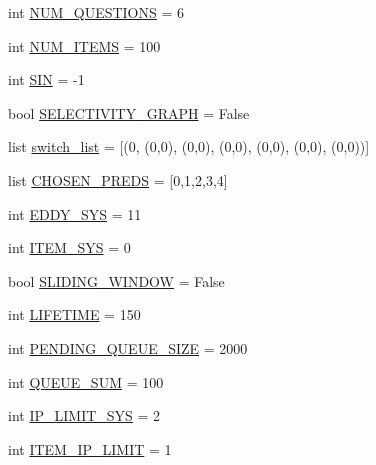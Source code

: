 \begin{DoxyCompactItemize}
\item 
int \mbox{\hyperlink{namespacedynamicfilterapp_1_1toggles_a6e9b8f89b507e81efe828c45c51e3906}{N\+U\+M\+\_\+\+Q\+U\+E\+S\+T\+I\+O\+NS}} = 6
\item 
int \mbox{\hyperlink{namespacedynamicfilterapp_1_1toggles_a0948720f253a5f2fc7689b2968c8b619}{N\+U\+M\+\_\+\+I\+T\+E\+MS}} = 100
\item 
int \mbox{\hyperlink{namespacedynamicfilterapp_1_1toggles_a46cfe1555e9636aa02be672a0dbfcee8}{S\+IN}} = -\/1
\item 
bool \mbox{\hyperlink{namespacedynamicfilterapp_1_1toggles_a7bfe56554845cde1c15e59ba47f471ed}{S\+E\+L\+E\+C\+T\+I\+V\+I\+T\+Y\+\_\+\+G\+R\+A\+PH}} = False
\item 
list \mbox{\hyperlink{namespacedynamicfilterapp_1_1toggles_abbafede9e00a5523a3cfea9fc4ff4764}{switch\+\_\+list}} = \mbox{[}(0, (0,0), (0,0), (0,0), (0,0), (0,0), (0,0))\mbox{]}
\item 
list \mbox{\hyperlink{namespacedynamicfilterapp_1_1toggles_a1e059d484294d0a2661de21590419600}{C\+H\+O\+S\+E\+N\+\_\+\+P\+R\+E\+DS}} = \mbox{[}0,1,2,3,4\mbox{]}
\item 
int \mbox{\hyperlink{namespacedynamicfilterapp_1_1toggles_a549d2c90f3f5922ad1442df2113fca1b}{E\+D\+D\+Y\+\_\+\+S\+YS}} = 11
\item 
int \mbox{\hyperlink{namespacedynamicfilterapp_1_1toggles_ae8b7db6fd373a0c3225ad361f894aee2}{I\+T\+E\+M\+\_\+\+S\+YS}} = 0
\item 
bool \mbox{\hyperlink{namespacedynamicfilterapp_1_1toggles_adf3c8ab64e62d33397a389d7ba49fe69}{S\+L\+I\+D\+I\+N\+G\+\_\+\+W\+I\+N\+D\+OW}} = False
\item 
int \mbox{\hyperlink{namespacedynamicfilterapp_1_1toggles_a06966aed6fa634825f18ad256f386496}{L\+I\+F\+E\+T\+I\+ME}} = 150
\item 
int \mbox{\hyperlink{namespacedynamicfilterapp_1_1toggles_a642cb0e1f266db761b270ea65af5425a}{P\+E\+N\+D\+I\+N\+G\+\_\+\+Q\+U\+E\+U\+E\+\_\+\+S\+I\+ZE}} = 2000
\item 
int \mbox{\hyperlink{namespacedynamicfilterapp_1_1toggles_a472153a69096a3f18b32cd5ac247f658}{Q\+U\+E\+U\+E\+\_\+\+S\+UM}} = 100
\item 
int \mbox{\hyperlink{namespacedynamicfilterapp_1_1toggles_ab27926159525360b29661a4778b0ce7c}{I\+P\+\_\+\+L\+I\+M\+I\+T\+\_\+\+S\+YS}} = 2
\item 
int \mbox{\hyperlink{namespacedynamicfilterapp_1_1toggles_a755f2e9edbb8b4d5039a950757b9cfb2}{I\+T\+E\+M\+\_\+\+I\+P\+\_\+\+L\+I\+M\+IT}} = 1

\end{DoxyCompactItemize}
